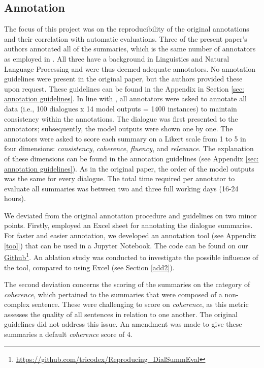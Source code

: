 \subsection{Annotation}
\label{annotation}
The focus of this project was on the reproducibility of the original annotations and their correlation with automatic evaluations. Three of the present paper's authors annotated all of the summaries, which is the same number of annotators as employed in \citet{gao2022dialsummeval}. All three have a background in Linguistics and Natural Language Processing and were thus deemed adequate annotators. No annotation guidelines were present in the original paper, but the authors provided these upon request. These guidelines can be found in the Appendix in Section \ref{sec: annotation guidelines}. In line with \citet{gao2022dialsummeval}, all annotators were asked to annotate all data (i.e., 100 dialogues x 14 model outputs = 1400 instances) to maintain consistency within the annotations. The dialogue was first presented to the annotators; subsequently, the model outputs were shown one by one. The annotators were asked to score each summary on a Likert scale from 1 to 5 in four dimensions: \textit{consistency}, \textit{coherence}, \textit{fluency}, and \textit{relevance}. The explanation of these dimensions can be found in the annotation guidelines (see Appendix \ref{sec: annotation guidelines}). As in the original paper, the order of the model outputs was the same for every dialogue. The total time required per annotator to evaluate all summaries was between two and three full working days (16-24 hours). 

We deviated from the original annotation procedure and guidelines on two minor points. Firstly, \citet{gao2022dialsummeval} employed an Excel sheet for annotating the dialogue summaries. For faster and easier annotation, we developed an annotation tool (see Appendix \ref{tool}) that can be used in a Jupyter Notebook. The code can be found on our \href{https://github.com/tricodex/Reproducing_DialSummEval}{Github}\footnote{\label{github}\href{https://github.com/tricodex/Reproducing_DialSummEval}{https://github.com/tricodex/Reproducing\_DialSummEval}}. An ablation study was conducted to investigate the possible influence of the tool, compared to using Excel (see Section \ref{add2}). 

The second deviation concerns the scoring of the summaries on the category of \textit{coherence}, which pertained to the summaries that were composed of a non-complex sentence. These were challenging to score on \textit{coherence}, as this metric assesses the quality of all sentences in relation to one another. The original guidelines did not address this issue. An amendment was made to give these summaries a default \textit{coherence} score of 4.

